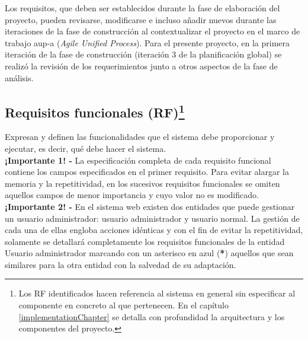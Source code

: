 \documentclass[12pt,a4paper, twoside]{report}
\begin{document}
	Los requisitos, que deben ser establecidos durante la fase de elaboración del proyecto, pueden revisarse, modificarse e incluso añadir nuevos durante las iteraciones de la fase de construcción al contextualizar el proyecto en el marco de trabajo \gls{aup-a} (\textit{Agile Unified Process}). Para el presente proyecto, en la primera iteración de la fase de construcción (iteración 3 de la planificación global) se realizó la revisión de los requerimientos junto a otros aspectos de la fase de análisis.

	\subsection[Requisitos funcionales (RF)]{Requisitos funcionales (RF)\footnote{Los RF identificados hacen referencia al sistema en general sin especificar al componente en concreto al que pertenecen. En el capítulo \ref{implementationChapter} se detalla con profundidad la arquitectura y los componentes del proyecto.}}
	
	Expresan y definen las funcionalidades que el sistema debe proporcionar y ejecutar, es decir, qué debe hacer el sistema. \\
	
	\textbf{¡Importante 1! -} La especificación completa de cada requisito funcional contiene los campos especificados en el primer requisito. Para evitar alargar la memoria y la repetitividad, en los sucesivos requisitos funcionales se omiten aquellos campos de menor importancia y cuyo valor no es modificado. \\

	\textbf{¡Importante 2! -} En el sistema web existen dos entidades que puede gestionar un usuario administrador: usuario administrador y usuario normal. La gestión de cada una de ellas engloba acciones idénticas y con el fin de evitar la repetitividad, solamente se detallará completamente los requisitos funcionales de la entidad Usuario administrador marcando con un asterisco en azul (\textbf{{\color{black!40!blue}*}}) aquellos que sean similares para la otra entidad con la salvedad de su adaptación. \\
	
\end{document}
